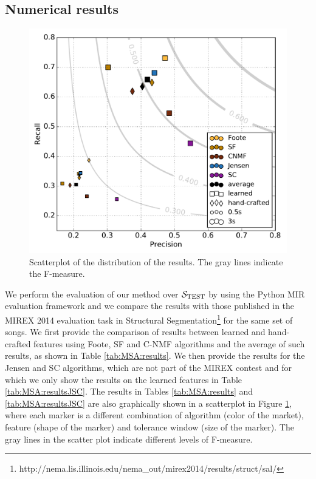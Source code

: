 \subsection{Numerical results}
 \begin{figure}[tb]
 	\centering
 	\includegraphics[width=.9\textwidth]{img/MSA/results_hc.pdf}
 	\caption{Scatterplot of the distribution of the results. The gray lines indicate the F-measure.}
     \label{fig:MSA:results}
 \end{figure} 

We perform the evaluation of our method over $\mathcal{S}_\text{TEST}$ by using the Python MIR evaluation framework\cite{mir_eval} and we compare the results with those published in the MIREX 2014 evaluation task in Structural Segmentation\footnote{{http://nema.lis.illinois.edu/nema\_out/mirex2014/results/struct/sal/}} for the same set of songs. We first provide the comparison of results between learned and hand-crafted features using Foote, SF and C-NMF algorithms and the average of such results, as shown in Table \ref{tab:MSA:results}. We then provide the results for the Jensen and SC algorithms, which are not part of the MIREX contest and for which we only show the results on the learned features in Table \ref{tab:MSA:resultsJSC}. The results in Tables \ref{tab:MSA:results} and \ref{tab:MSA:resultsJSC} are also graphically shown in a scatterplot in Figure \ref{fig:MSA:results}, where each marker is a different combination of algorithm (color of the market), feature (shape of the marker) and tolerance window (size of the marker). The gray lines in the scatter plot indicate different levels of F-measure.


